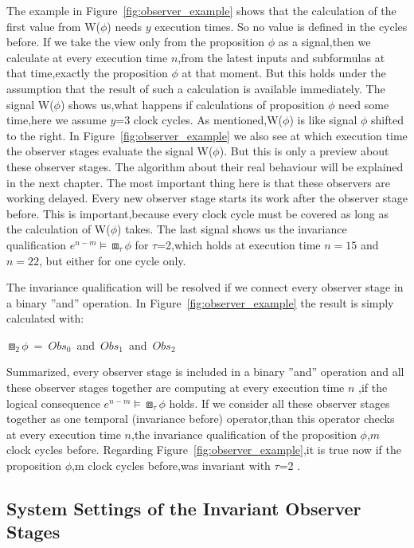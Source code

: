 The example in Figure~\ref{fig:observer_example} shows that the calculation of the first value from W($\phi$) needs $y$
execution times. So no value is defined in the cycles before. If we take the view only from the proposition $\phi$ as a signal,then we calculate
at every execution time $n$,from the latest inputs and subformulas at that time,exactly the proposition $\phi$ at that moment.
But this holds under the assumption that the result of such a calculation is available immediately.
The signal W($\phi$) shows us,what happens if calculations of proposition $\phi$ need some time,here we assume $y$=3 clock cycles.
As mentioned,W($\phi$) is like signal $\phi$ shifted to the right.
In Figure~\ref{fig:observer_example} we also see at which execution time the observer stages evaluate the signal W($\phi$).
But this is only a preview about these observer stages. The algorithm about their real behaviour will be explained in the next chapter.
The most important thing here is that these observers are working delayed. Every new observer stage starts its work after the observer stage before.
This is important,because every clock cycle must be covered as long as the calculation of W($\phi$) takes. 
The last signal shows us the invariance qualification $e^{n-m} \models \boxbox_\tau \phi$ for $\tau$=2,which holds at execution time $n=15$ and $n=22$,
but either for one cycle only.

The invariance qualification will be resolved if we connect every observer stage in a binary ''and'' operation.
In Figure~\ref{fig:observer_example} the result is simply calculated with:
\newline
\begin{center} 
\mbox{$\boxbox_2 \phi$ = $Obs_0$ and $Obs_1$ and $Obs_2$}
\end{center}
\newpage
Summarized, every observer stage is included in a binary ''and'' operation and all these observer stages together are computing at every execution time $n$
,if the logical consequence $e^{n-m} \models \boxbox_\tau \phi$ holds. 
If we consider all these observer stages together as one temporal (invariance before) operator,than this operator checks
at every execution time $n$,the invariance qualification of the proposition $\phi$,$m$ clock cycles before.
Regarding Figure~\ref{fig:observer_example},it is true now if the proposition $\phi$,m clock cycles before,was invariant with $\tau$=2 .
\newline

\subsection{System Settings of the Invariant Observer Stages}

